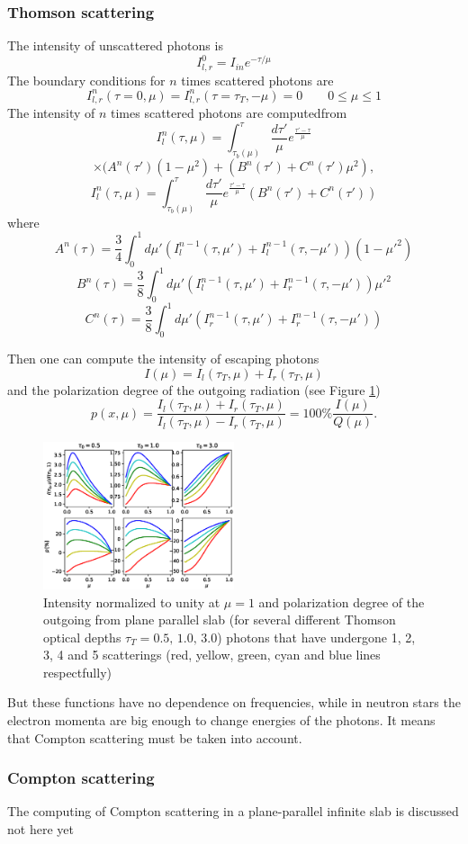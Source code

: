 \documentclass[iop, usenatbib]{emulateapj}
\newcommand{\be}{\begin{equation}}
\newcommand{\ee}{\end{equation}}
\begin{document}
\subsubsection{Thomson scattering}
The intensity of unscattered photons is
\be
I_{l,r}^0=I_{in}e^{-\tau/\mu}
\ee
The boundary conditions for $n$ times scattered photons are
\be
I_{l,r}^n(\tau=0,\mu)=I_{l,r}^n(\tau=\tau_T,-\mu)=0\qquad 0\leq\mu\leq1
\ee
The intensity of $n$ times scattered photons are computedfrom
$$
I_l^n(\tau,\mu)=\int_{\tau_b(\mu)}^\tau \frac{d\tau'}\mu e^{\frac{\tau'-\tau}\mu}$$\be
\times( A^n(\tau')(1-\mu^2) + (B^n(\tau')+C^n(\tau')\mu^2 ),
\ee$$
I_l^n(\tau,\mu)=\int_{\tau_b(\mu)}^\tau \frac{d\tau'}\mu e^{\frac{\tau'-\tau}\mu}
(B^n(\tau')+C^n(\tau'))
$$
where $$
A^n(\tau)=\frac34\int_0^1 d\mu' (I^{n-1}_l (\tau,\mu')+I^{n-1}_l (\tau,-\mu')) (1-\mu'^2)
$$\be
B^n(\tau)=\frac38\int_0^1 d\mu' (I^{n-1}_l (\tau,\mu')+I^{n-1}_r (\tau,-\mu'))\mu'^2
\ee$$
C^n(\tau)=\frac38\int_0^1 d\mu' (I^{n-1}_r (\tau,\mu')+I^{n-1}_r (\tau,-\mu')) 
$$

Then one can compute the intensity of escaping photons\be
I(\mu)=I_l(\tau_T,\mu)+I_r(\tau_T,\mu)
\ee
and the polarization degree of the outgoing radiation (see Figure \ref{figure:ThomsonIp})
\be
p(x,\mu)
=\frac{I_l(\tau_T,\mu)+I_r(\tau_T,\mu)}{I_l(\tau_T,\mu)-I_r(\tau_T,\mu)}
=100\%\frac{I(\mu)}{Q(\mu)}.\ee


\begin{figure}
 \centering
 \includegraphics[width=0.5\textwidth]{Ip.eps}
 \caption{Intensity normalized to unity at $\mu=1$ and polarization degree of the outgoing from plane parallel slab (for several different Thomson optical depths $\tau_T=0.5,\,1.0,\,3.0$) photons
  that have undergone 1, 2, 3, 4 and 5 scatterings (red, yellow, green, cyan and blue lines respectfully)} 
 \label{figure:ThomsonIp}
\end{figure}

But these functions have no dependence on frequencies, while in neutron stars the electron momenta are big enough to change energies of the photons. It means that Compton scattering must be taken into account.

\subsubsection{Compton scattering}
The computing of Compton scattering in a plane-parallel infinite slab is discussed  not here yet



 
\end{document}
